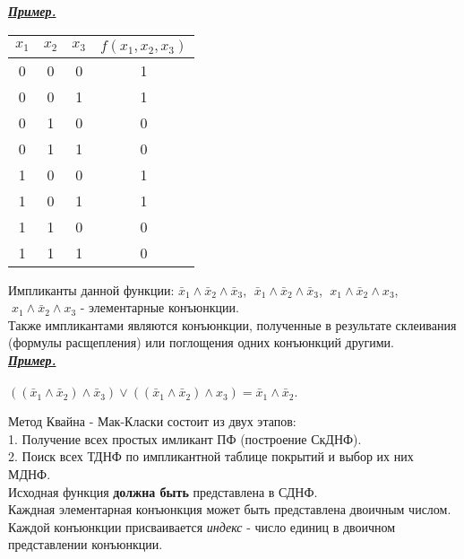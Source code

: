 \documentclass{article}
\begin{document}
	\newpage
	\textit{\textbf{\underline{Пример.}}}
	
	\begin{table}[ht]
		\centering
		\begin{tabular}{|c|c|c|c|}
			\hline
			\multicolumn{1}{|l|}{$x_1$} & \multicolumn{1}{l|}{$x_2$} & \multicolumn{1}{l|}{$x_3$} & \multicolumn{1}{l|}{$f(x_1, x_2, x_3)$} \\ \hline
			0 & 0 & 0 & 1 \\ \hline
			0 & 0 & 1 & 1 \\ \hline
			0 & 1 & 0 & 0 \\ \hline
			0 & 1 & 1 & 0 \\ \hline
			1 & 0 & 0 & 1 \\ \hline
			1 & 0 & 1 & 1 \\ \hline
			1 & 1 & 0 & 0 \\ \hline
			1 & 1 & 1 & 0 \\ \hline
		\end{tabular}
	\end{table}
	
	Импликанты данной функции: $\bar{x}_1 \wedge \bar{x}_2 \wedge \bar{x}_3$,
	$\; \bar{x}_1 \wedge \bar{x}_2 \wedge \bar{x}_3$, $\; x_1 \wedge \bar{x}_2 \wedge x_3$,
	$\; x_1 \wedge \bar{x}_2 \wedge x_3$ - элементарные конъюнкции.\\
	Также импликантами являются конъюнкции, полученные в результате склеивания (формулы расщепления)
	или поглощения одних конъюнкций другими.\\
	
	\textit{\textbf{\underline{Пример.}}}\\\\
	$((\bar{x}_1 \wedge \bar{x}_2) \wedge \bar{x}_3) \vee ((\bar{x}_1 \wedge \bar{x}_2) \wedge x_3) = \bar{x}_1 \wedge \bar{x}_2.$
	
	Метод Квайна - Мак-Класки состоит из двух этапов:\\
	1. Получение всех простых имликант ПФ (построение СкДНФ).\\
	2. Поиск всех ТДНФ по импликантной таблице покрытий и выбор их них МДНФ.\\
	Исходная функция \textbf{должна быть} представлена в СДНФ.\\
	Каждная элементарная конъюнкция может быть представлена двоичным числом.\\
	Каждой конъюнкции присваивается \textit{индекс} - число единиц в двоичном
	представлении конъюнкции.
	
\end{document}
